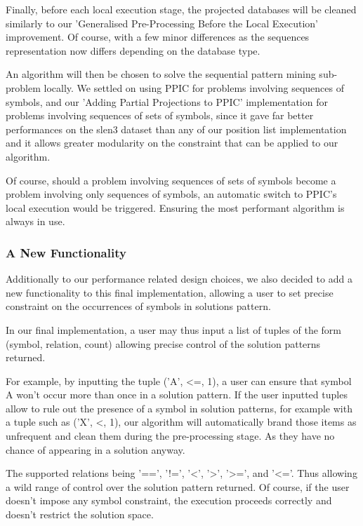 \documentclass{eplmastersthesis}
\begin{document}
Finally, before each local execution stage, the projected databases will be cleaned similarly to our 'Generalised Pre-Processing Before the Local Execution' improvement. Of course, with a few minor differences as the sequences representation now differs depending on the database type. \newline

An algorithm will then be chosen to solve the sequential pattern mining sub-problem locally. We settled on using PPIC for problems involving sequences of symbols, and our 'Adding Partial Projections to PPIC' implementation for problems involving sequences of sets of symbols, since it gave far better performances on the slen3 dataset than any of our position list implementation and it allows greater modularity on the constraint that can be applied to our algorithm. \newline

Of course, should a problem involving sequences of sets of symbols become a problem involving only sequences of symbols, an automatic switch to PPIC's local execution would be triggered. Ensuring the most performant algorithm is always in use.

\subsubsection{A New Functionality}

Additionally to our performance related design choices, we also decided to add a new functionality to this final implementation, allowing a user to set precise constraint on the occurrences of symbols in solutions pattern. \newline

In our final implementation, a user may thus input a list of tuples of the form (symbol, relation, count) allowing precise control of the solution patterns returned. \newline

For example, by inputting the tuple ('A', <=, 1), a user can ensure that symbol A won't occur more than once in a solution pattern. If the user inputted tuples allow to rule out the presence of a symbol in solution patterns, for example with a tuple such as ('X', <, 1), our algorithm will automatically brand those items as unfrequent and clean them during the pre-processing stage. As they have no chance of appearing in a solution anyway. \newline

The supported relations being '==', '!=', '<', '>', '>=', and '<='. Thus allowing a wild range of control over the solution pattern returned. Of course, if the user doesn't impose any symbol constraint, the execution proceeds correctly and doesn't restrict the solution space. \newline
\end{document}
